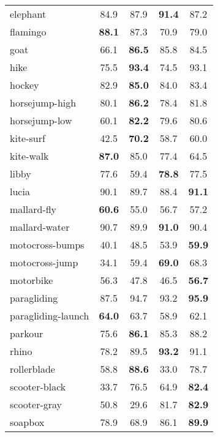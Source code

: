 \documentclass[10pt,twocolumn,letterpaper]{article}
\begin{document}
\begin{table}
\begin{centering}
\begin{tabular}{l|@{   }c@{   }c@{   }c@{   }c@{    }}
elephant            &     84.9    &     87.9    & \bf 91.4  &		87.2 \\
flamingo            & \bf 88.1    &     87.3    &     70.9  &		79.0 \\
goat                &     66.1    & \bf 86.5    &     85.8  &		84.5 \\
hike                &     75.5    & \bf 93.4    &     74.5  &		93.1 \\
hockey              &     82.9    & \bf 85.0    &     84.0  &		83.4 \\
horsejump-high      &     80.1    & \bf 86.2    &     78.4  &		81.8 \\
horsejump-low       &     60.1    & \bf 82.2    &     79.6  &		80.6 \\
kite-surf           &     42.5    & \bf 70.2    &     58.7  &		60.0 \\
kite-walk           & \bf 87.0    &     85.0    &     77.4  &		64.5 \\
libby               &     77.6    &     59.4    & \bf 78.8  &		77.5 \\
lucia               &  90.1    &     89.7    &     88.4  &	\bf 	91.1 \\
mallard-fly         & \bf 60.6    &     55.0    &     56.7  &		57.2 \\
mallard-water       &     90.7    &     89.9    & \bf 91.0  &		90.4 \\
motocross-bumps     &     40.1    &     48.5    &  53.9  &	\bf 	59.9 \\
motocross-jump      &     34.1    &     59.4    & \bf 69.0  &		68.3 \\
motorbike           &  56.3    &     47.8    &     46.5  &	\bf 	56.7 \\
paragliding         &     87.5    &  94.7    &     93.2  &	\bf 	95.9 \\
paragliding-launch  & \bf 64.0    &     63.7    &     58.9  &		62.1 \\
parkour             &     75.6    & \bf 86.1    &     85.3  &		88.2 \\
rhino               &     78.2    &     89.5    & \bf 93.2  &		91.1 \\
rollerblade         &     58.8    & \bf 88.6    &     33.0  &		78.7 \\
scooter-black       &     33.7    &  76.5    &     64.9  &	\bf 	82.4 \\
scooter-gray        &     50.8    &     29.6    &  81.7  &	\bf 	82.9 \\
soapbox             &     78.9    &     68.9    &  86.1  &	\bf 	89.9 \\

\end{tabular}
\end{centering}
\end{table}
\end{document}
